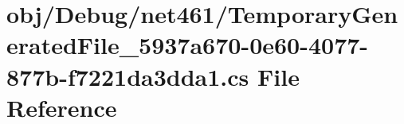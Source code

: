 \hypertarget{_debug_2net461_2_temporary_generated_file__5937a670-0e60-4077-877b-f7221da3dda1_8cs}{}\section{obj/\+Debug/net461/\+Temporary\+Generated\+File\+\_\+5937a670-\/0e60-\/4077-\/877b-\/f7221da3dda1.cs File Reference}
\label{_debug_2net461_2_temporary_generated_file__5937a670-0e60-4077-877b-f7221da3dda1_8cs}
